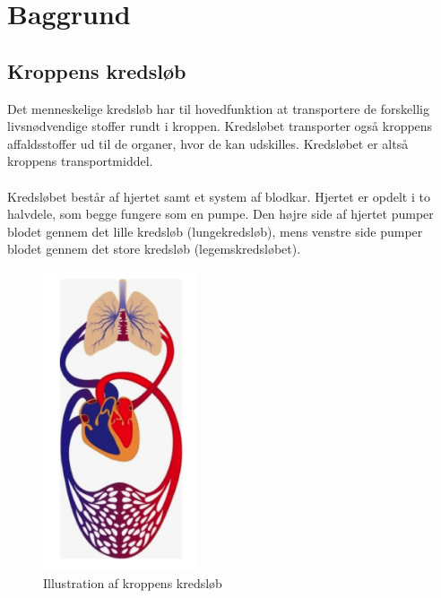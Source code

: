 \chapter{Baggrund}
\section{Kroppens kredsløb}
Det menneskelige kredsløb har til hovedfunktion at transportere de forskellig livsnødvendige stoffer rundt i kroppen. Kredsløbet transporter også kroppens affaldsstoffer ud til de organer, hvor de kan udskilles. Kredsløbet er altså kroppens transportmiddel. 
\\ \\
Kredsløbet består af hjertet samt et system af blodkar. Hjertet er opdelt i to halvdele, som begge fungere som en pumpe. Den højre side af hjertet pumper blodet gennem det lille kredsløb (lungekredsløb), mens venstre side pumper blodet gennem det store kredsløb (legemskredsløbet). 

\begin{figure}[H]
	\centering
	\includegraphics[width=0.4\textwidth]{Figurer/Snip20151209_69}
	\caption{Illustration af kroppens kredsløb}
\end{figure}

